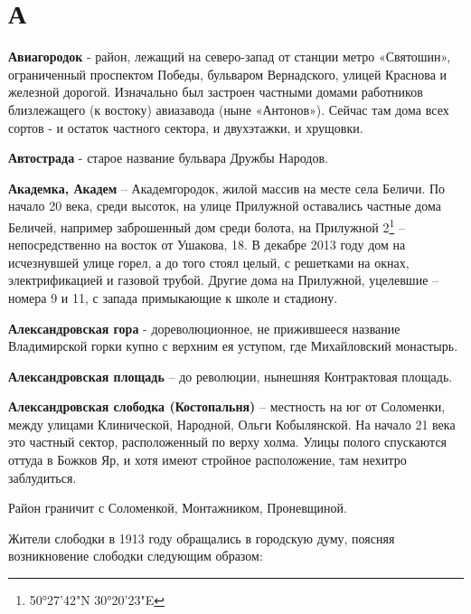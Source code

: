 \chapter*{А}


\textbf{Авиагородок} - район, лежащий на северо-запад от станции метро «Святошин», ограниченный проспектом Победы, бульваром Вернадского, улицей Краснова и железной дорогой. Изначально был застроен частными домами работников близлежащего (к востоку) авиазавода (ныне «Антонов»). Сейчас там дома всех сортов - и остаток частного сектора, и двухэтажки, и хрущовки.\\

\medskip

\textbf{Автострада} - старое название бульвара Дру\-жбы Народов.\\

\medskip

\textbf{Академка, Академ} – Академгородок, жилой массив на месте села Беличи. По начало 20 века, среди высоток, на улице Прилужной оставались частные дома Беличей, например заброшенный дом среди болота, на Прилужной 2\footnote{50°27'42"N 30°20'23"E} – непосредственно на восток от Ушакова, 18. В декабре 2013 году дом на исчезнувшей улице горел, а до того стоял целый, с решетками на окнах, электрификацией и газовой трубой. Другие дома на Прилужной, уцелевшие – номера 9 и 11, с запада примыкающие к школе и стадиону.\\

\medskip

\textbf{Александровская гора} - дореволюционное, не прижившееся название Владимирской горки купно с верхним ея уступом, где Михайловский монастырь.\\

\medskip

\textbf{Александровская площадь} – до революции, нынешняя Контрактовая площадь.\\ 

\medskip

\textbf{Александровская слободка (Костопальня)} – местность  на юг от Соломенки, между улицами Клинической, Народной, Ольги Кобылянской. На начало 21 века это частный сектор, расположенный по верху холма. Улицы полого спускаются оттуда в Божков Яр, и хотя имеют стройное расположение, там нехитро заблудиться.

Район граничит с Соломенкой, Монтажником, Проневщиной.

Жители слободки в 1913 году обращались в городскую думу, поясняя возникновение слободки следующим образом:

